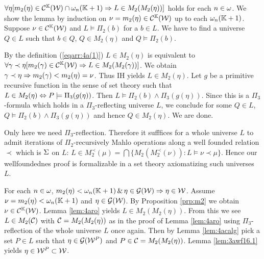 \documentclass{article}
\newcommand{\mK}{\mathbb{K}}
\begin{document}
\blem\label{lem:4aro}
 $\fal\eta[m_{2}(\eta)\in\mathcal{C}^{\mK}(\calw)\cap\ome_{n}(\mK+1) \Rarw L\in M_{2}(M_{2}(\eta))]$
 holds for {\rm each} $n\in\omega$.
\elem
\bprf 
We show the lemma by induction on $\nu=m_{2}(\eta)\in\mathcal{C}^{\mK}(\calw)$ up to each 
$\ome_{n}(\mK+1)$. Suppose $\nu\in\mathcal{C}^{\mK}(\calw)$ and $L\models\Pi_{2}(b)$ for a $b\in L$. We have to find a universe $Q\in L$ such that $b\in Q$, $Q\in M_{2}(\eta)$ and $Q\models\Pi_{2}(b)$.

By the definition (\ref{eqarr:4a(1)}) $L\in M_{2}(\eta)$ is equivalent to
$\fal\gam\prec\eta [ m_{2}(\gam)\in\mathcal{C}^{\mK}(\calw) \Rarw L\in M_{2}(M_{2}(\gam))]$.
We obtain $\gamma\prec\eta \Rightarrow m_{2}(\gamma)<m_{2}(\eta)=\nu$. 
Thus IH yields $L\in M_{2}(\eta)$.
Let $g$ be a primitive recursive function in the sense of set theory such that 
$L\in M_{2}(\eta) \Leftrightarrow P\models\Pi_{3}(g(\eta))$.
Then $L\models\Pi_{2}(b) \land \Pi_{3}(g(\eta))$. 
Since this is a $\Pi_{3}$-formula which holds in a $\Pi_{3}$-reflecting universe $L$, 
we conclude for some $Q\in L$, $Q\models\Pi_{2}(b)\land \Pi_{3}(g(\eta))$
 and hence $Q\in M_{2}(\eta)$. We are done.
\eprf

\brem
{\rm
Only here we need $\Pi_{3}$-reflection. Therefore it sufffices for a whole universe $L$ to admit iterations of $\Pi_{2}$-recursively Mahlo operations along a well founded relation $\prec$ which is $\Sigma$ on $L$: $L\in M_{2}^{\prec}(\mu)=\bigcap\{M_{2}(M_{2}^{\prec}(\nu)):L\models\nu\prec\mu\}$. Hence our wellfoundednes proof is formalizable in a set theory axiomatizing such universes $L$.
}
\erem


\blem\label{lem:3awf16.2}
For {\rm each} $n\in\omega$,
$m_{2}(\eta)<\ome_{n}(\mK+1)\spand \eta\in\calg(\calw) \Rarw \eta\in\calw$.
\elem
\bprf 
Assume $\nu=m_{2}(\eta)<\ome_{n}(\mK+1)$ and $\eta\in{\cal G}({\cal W})$. 
By Proposition \ref{prp:m2} we obtain $\nu\in\mathcal{C}^{\mK}(\calw)$.
Lemma \ref{lem:4aro} yields $L\in M_{2}(M_{2}(\eta))$. 
From this we see $L\in M_{2}({\cal C})$ with ${\cal C}=M_{2}(M_{2}(\eta))$ 
as in the proof of Lemma \ref{lem:4aro} using $\Pi_{3}$-reflection of the whole universe $L$ once again. 
Then by Lemma \ref{lem:4acalg} pick a set $P\in L$ such that 
$\eta\in{\cal G}({\cal W}^{P})$ and $P\in{\cal C}=M_{2}(M_{2}(\eta))$. 
Lemma \ref{lem:3awf16.1} yields $\eta\in{\cal W}^{P}\subset{\cal W}$.
\eprf
\end{document}
